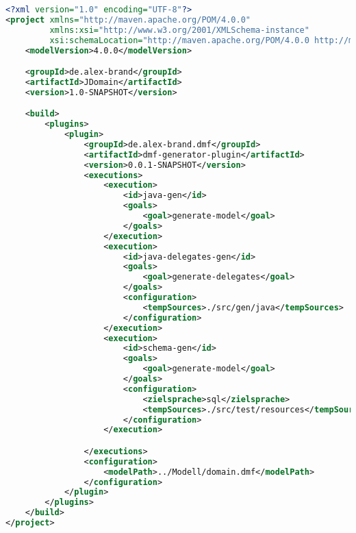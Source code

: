 \documentclass[./einleitung.tex]{subfiles}
\begin{document}
    \begin{lstlisting}[language=xml, caption=pom.xml des JDomain Artefakts, label=lst:jdomainPom]
<?xml version="1.0" encoding="UTF-8"?>
<project xmlns="http://maven.apache.org/POM/4.0.0"
         xmlns:xsi="http://www.w3.org/2001/XMLSchema-instance"
         xsi:schemaLocation="http://maven.apache.org/POM/4.0.0 http://maven.apache.org/xsd/maven-4.0.0.xsd">
    <modelVersion>4.0.0</modelVersion>

    <groupId>de.alex-brand</groupId>
    <artifactId>JDomain</artifactId>
    <version>1.0-SNAPSHOT</version>

    <build>
        <plugins>
            <plugin>
                <groupId>de.alex-brand.dmf</groupId>
                <artifactId>dmf-generator-plugin</artifactId>
                <version>0.0.1-SNAPSHOT</version>
                <executions>
                    <execution>
                        <id>java-gen</id>
                        <goals>
                            <goal>generate-model</goal>
                        </goals>
                    </execution>
                    <execution>
                        <id>java-delegates-gen</id>
                        <goals>
                            <goal>generate-delegates</goal>
                        </goals>
                        <configuration>
                            <tempSources>./src/gen/java</tempSources>
                        </configuration>
                    </execution>
                    <execution>
                        <id>schema-gen</id>
                        <goals>
                            <goal>generate-model</goal>
                        </goals>
                        <configuration>
                            <zielsprache>sql</zielsprache>
                            <tempSources>./src/test/resources</tempSources>
                        </configuration>
                    </execution>

                </executions>
                <configuration>
                    <modelPath>../Modell/domain.dmf</modelPath>
                </configuration>
            </plugin>
        </plugins>
    </build>
</project>
    \end{lstlisting}
\end{document}
